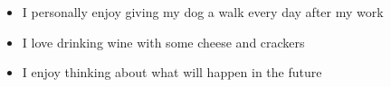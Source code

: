\documentclass[12pt]{article}
\begin{document}

\begin{itemize}
\vspace{1mm}
\item I personally enjoy giving my dog a walk every day after my work\\ 
\vspace{-3.5mm}
\item I love drinking wine with some cheese and crackers\\
\vspace{-3.5mm}
\item I enjoy thinking about what will happen in the future
\end{itemize}
\end{document}
